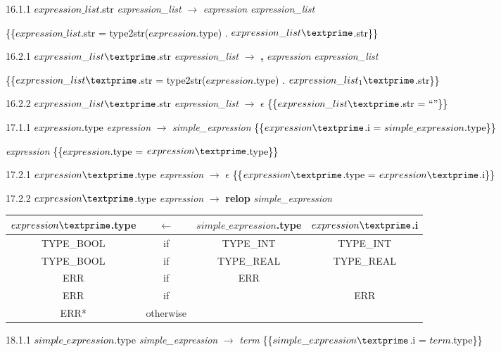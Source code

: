 16.1.1 \textcolor{black}{$expression\_list$.str} \emph{expression\_list} $\rightarrow$ \emph{expression} \emph{expression\_list\textprime}

\textcolor{black}{\{\{$expression\_list$.str = type2str($expression$.type) . $expression\_list\textprime$.str\}\}}

16.2.1 \textcolor{black}{$expression\_list\textprime$.str} \emph{expression\_list\textprime} $\rightarrow$ \textbf{,} \emph{expression} \emph{expression\_list\textprime}

\textcolor{black}{\{\{$expression\_list\textprime$.str = type2str($expression$.type) . $expression\_list_1\textprime$.str\}\}}

16.2.2 \textcolor{black}{$expression\_list\textprime$.str} \emph{expression\_list\textprime} $\rightarrow$ $\epsilon$ \textcolor{black}{\{\{$expression\_list\textprime$.str = ``''\}\}}

17.1.1 \textcolor{black}{$expression$.type} \emph{expression} $\rightarrow$ \emph{simple\_expression} \textcolor{black}{\{\{$expression\textprime$.i = $simple\_expression$.type\}\}}

\emph{expression\textprime} \textcolor{black}{\{\{$expression$.type = $expression\textprime$.type\}\}}

17.2.1 \textcolor{black}{$expression\textprime$.type} \emph{expression\textprime} $\rightarrow$ $\epsilon$ \textcolor{black}{\{\{$expression\textprime$.type = $expression\textprime$.i\}\}}

17.2.2 \textcolor{black}{$expression\textprime$.type} \emph{expression\textprime} $\rightarrow$ \textbf{relop} \emph{simple\_expression}

\begin{tabular}[t]{|c|c|c|c|}
  \hline

  $expression\textprime$.type & \textbf{$\leftarrow$} & $simple\_expression$.type & $expression\textprime$.i \\

  \hline

  TYPE\_BOOL & if & TYPE\_INT & TYPE\_INT \\
  TYPE\_BOOL & if & TYPE\_REAL & TYPE\_REAL \\
  ERR & if & ERR & \\
  ERR & if & & ERR \\
  ERR* & otherwise & & \\
  \hline

\end{tabular}

18.1.1 \textcolor{black}{$simple\_expression$.type} \emph{simple\_expression} $\rightarrow$ \emph{term} \textcolor{black}{\{\{$simple\_expression\textprime$.i = $term$.type\}\}}

